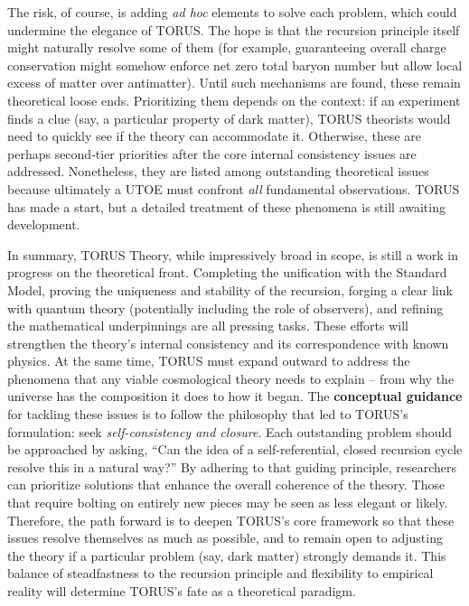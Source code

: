 \documentclass[
]{article}
\begin{document}
{\begin{itemize}
  The risk, of course, is adding \emph{ad hoc} elements to solve each
  problem, which could undermine the elegance of TORUS. The hope is that
  the recursion principle itself might naturally resolve some of them
  (for example, guaranteeing overall charge conservation might somehow
  enforce net zero total baryon number but allow local excess of matter
  over antimatter). Until such mechanisms are found, these remain
  theoretical loose ends. Prioritizing them depends on the context: if
  an experiment finds a clue (say, a particular property of dark
  matter), TORUS theorists would need to quickly see if the theory can
  accommodate it. Otherwise, these are perhaps second-tier priorities
  after the core internal consistency issues are addressed. Nonetheless,
  they are listed among outstanding theoretical issues because
  ultimately a UTOE must confront \emph{all} fundamental observations.
  TORUS has made a start, but a detailed treatment of these phenomena is
  still awaiting development.
\end{itemize}

In summary, TORUS Theory, while impressively broad in scope, is still a
work in progress on the theoretical front. Completing the unification
with the Standard Model, proving the uniqueness and stability of the
recursion, forging a clear link with quantum theory (potentially
including the role of observers), and refining the mathematical
underpinnings are all pressing tasks. These efforts will strengthen the
theory's internal consistency and its correspondence with known physics.
At the same time, TORUS must expand outward to address the phenomena
that any viable cosmological theory needs to explain -- from why the
universe has the composition it does to how it began. The
\textbf{conceptual guidance} for tackling these issues is to follow the
philosophy that led to TORUS's formulation: seek \emph{self-consistency
and closure}. Each outstanding problem should be approached by asking,
``Can the idea of a self-referential, closed recursion cycle resolve
this in a natural way?'' By adhering to that guiding principle,
researchers can prioritize solutions that enhance the overall coherence
of the theory. Those that require bolting on entirely new pieces may be
seen as less elegant or likely. Therefore, the path forward is to deepen
TORUS's core framework so that these issues resolve themselves as much
as possible, and to remain open to adjusting the theory if a particular
problem (say, dark matter) strongly demands it. This balance of
steadfastness to the recursion principle and flexibility to empirical
reality will determine TORUS's fate as a theoretical paradigm.

}
\end{document}
